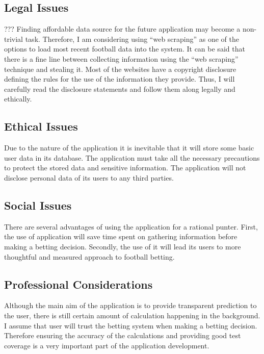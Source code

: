 \subsection{Legal Issues}
\label{leaglissues_back}
???
Finding affordable data source for the future application may become a non-trivial task. Therefore, I am considering using “web scraping” as one of the options to load most recent football data into the system. It can be said that there is a fine line between collecting information using the “web scraping” technique and stealing it. Most of the websites have a copyright disclosure defining the rules for the use of the information they provide. Thus, I will carefully read the disclosure statements and follow them along legally and ethically. 

\subsection{Ethical Issues}
\label{ethicalissues_back}
Due to the nature of the application it is inevitable that it will store some basic user data in its database. The application must take all the necessary precautions to protect the stored data and sensitive information. The application will not disclose personal data of its users to any third parties.

\subsection{Social Issues}
\label{socialissues_back}
There are several advantages of using the application for a rational punter. First,  the use of application will save time spent on gathering information before making a betting decision. Secondly, the use of it will lead its users to more thoughtful and measured approach to football betting. 

\subsection{Professional Considerations}
\label{prof_back}
Although the main aim of the application is to provide transparent prediction to the user, there is still certain amount of calculation happening in the background. I assume that user will trust the betting system when making a betting decision. Therefore ensuring the accuracy of the calculations and providing good test coverage is a very important part of the application development.